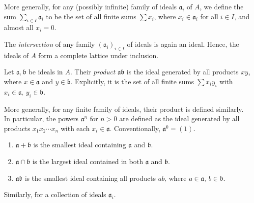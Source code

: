 More generally, for any (possibly infinite) family of ideals \( \mathfrak{a}_i \) of \( A \), we define the sum \( \sum_{i \in I} \mathfrak{a}_i \) to be the set of all finite sums \( \sum x_i \), where \( x_i \in \mathfrak{a}_i \) for all \( i \in I \), and almost all \( x_i = 0 \).


\begin{definition}
The \emph{intersection} of any family \( (\mathfrak{a}_i)_{i \in I} \) of ideals is again an ideal. Hence, the ideals of \( A \) form a complete lattice under inclusion.
\end{definition}

\begin{definition}
Let \( \mathfrak{a}, \mathfrak{b} \) be ideals in \( A \). Their \emph{product} \( \mathfrak{a} \mathfrak{b} \) is the ideal generated by all products \( xy \), where \( x \in \mathfrak{a} \) and \( y \in \mathfrak{b} \). Explicitly, it is the set of all finite sums \( \sum x_i y_i \) with \( x_i \in \mathfrak{a} \), \( y_i \in \mathfrak{b} \).
\end{definition}

    More generally, for any finite family of ideals, their product is defined similarly.
    In particular, the powers \( \mathfrak{a}^n \) for \( n > 0 \) are defined as the ideal generated by all products \( x_1 x_2 \cdots x_n \) with each \( x_i \in \mathfrak{a} \). Conventionally, \( \mathfrak{a}^0 = (1) \).



\begin{remark}
\begin{enumerate}
    \item \( \mathfrak{a} + \mathfrak{b} \) is the smallest ideal containing \( \mathfrak{a} \) and \( \mathfrak{b} \).
    \item \( \mathfrak{a} \cap \mathfrak{b} \) is the largest ideal contained in both \( \mathfrak{a} \) and \( \mathfrak{b} \).
    \item \( \mathfrak{a} \mathfrak{b} \) is the smallest ideal containing all products \( ab \), where \( a \in \mathfrak{a} \), \( b \in \mathfrak{b} \).
\end{enumerate}
\end{remark}

    Similarly, for a collection of ideals \( \mathfrak{a}_i \). 

        

